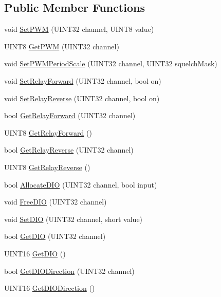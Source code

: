 \subsection*{Public Member Functions}
\begin{DoxyCompactItemize}
\item 
void \hyperlink{classDigitalModule_abc8303e66903fec0e24714f307cbb68c}{SetPWM} (UINT32 channel, UINT8 value)
\item 
UINT8 \hyperlink{classDigitalModule_a5478b09023e19893ac3829c653221089}{GetPWM} (UINT32 channel)
\item 
void \hyperlink{classDigitalModule_aaf1ce0fcdc44fa5b542a34c3c0f308c0}{SetPWMPeriodScale} (UINT32 channel, UINT32 squelchMask)
\item 
void \hyperlink{classDigitalModule_aef58ca9a278fae8525da6324ec0f0b1a}{SetRelayForward} (UINT32 channel, bool on)
\item 
void \hyperlink{classDigitalModule_a6ce11154d9a4480ff1f017c9d8f0b9a5}{SetRelayReverse} (UINT32 channel, bool on)
\item 
bool \hyperlink{classDigitalModule_a521a7406eac1b38544f1eae056dd94bd}{GetRelayForward} (UINT32 channel)
\item 
UINT8 \hyperlink{classDigitalModule_a42c0a0ce307e655ee5a87c16bdaddc04}{GetRelayForward} ()
\item 
bool \hyperlink{classDigitalModule_a4f95a8b6be89d69091cc5d536ed22384}{GetRelayReverse} (UINT32 channel)
\item 
UINT8 \hyperlink{classDigitalModule_afc5858981757c8ecba5f533e8c4b69a8}{GetRelayReverse} ()
\item 
bool \hyperlink{classDigitalModule_a55769aca83a090e7869764829248561a}{AllocateDIO} (UINT32 channel, bool input)
\item 
void \hyperlink{classDigitalModule_a86f94ef21bf5a5b6dbdf66a18f8b8328}{FreeDIO} (UINT32 channel)
\item 
void \hyperlink{classDigitalModule_abd4f1500090e6e48cbbf8ad244d29fcd}{SetDIO} (UINT32 channel, short value)
\item 
bool \hyperlink{classDigitalModule_aff95a87a6af8d7d1e76bb51c2de9fc35}{GetDIO} (UINT32 channel)
\item 
UINT16 \hyperlink{classDigitalModule_afc2c26333c078645033206d3ee5d7f51}{GetDIO} ()
\item 
bool \hyperlink{classDigitalModule_a4d3a7e90d5cca4e77c745865683b2957}{GetDIODirection} (UINT32 channel)
\item 
UINT16 \hyperlink{classDigitalModule_af4acbac69f014df143d972512e014a0f}{GetDIODirection} ()

\end{DoxyCompactItemize}
